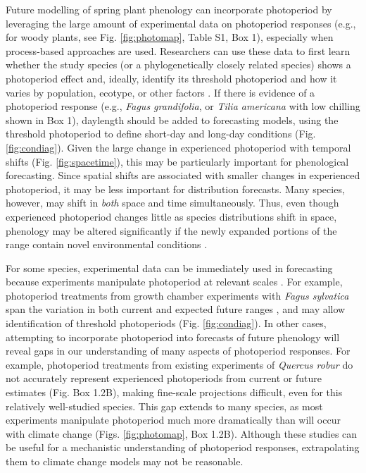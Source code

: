 \documentclass{article}
\begin{document}
\par Future modelling of spring plant phenology can incorporate photoperiod by leveraging the large amount of experimental data on photoperiod responses (e.g., for woody plants, see Fig. \ref{fig:photomap}, Table S1, Box 1), especially when process-based approaches are used. Researchers can use these data to first learn whether the study species (or a phylogenetically closely related species) shows a photoperiod effect and, ideally, identify its threshold photoperiod and how it varies by population, ecotype, or other factors \citep{tobin2008,bradshaw2006}. If there is evidence of a photoperiod response (e.g., \emph{Fagus grandifolia}, or \emph{Tilia americana} with low chilling shown in Box 1), daylength should be added to forecasting models, using the threshold photoperiod to define short-day and long-day conditions (Fig. \ref{fig:condiag}). Given the large change in experienced photoperiod with temporal shifts (Fig. \ref{fig:spacetime}), this may be particularly important for phenological forecasting. Since spatial shifts are associated with smaller changes in experienced photoperiod, it may be less important for distribution forecasts. Many species, however, may shift in \emph{both} space and time simultaneously. Thus, even though experienced photoperiod changes little as species distributions shift in space, phenology may be altered significantly if the newly expanded portions of the range contain novel environmental conditions \citep{martin2014}.

\par For some species, experimental data can be immediately used in forecasting because experiments manipulate photoperiod at relevant scales \citep[e.g., ][Figs. \ref{fig:photomap}\& Box 1.1, Table S1]{Heide:2015aa,Basler:2014aa}. For example, photoperiod treatments from growth chamber experiments with \emph{Fagus sylvatica} span the variation in both current and expected future ranges \citep[Fig. Box 1.2, ][]{duputie2015}, and may allow identification of threshold photoperiods (Fig. \ref{fig:condiag}). In other cases, attempting to incorporate photoperiod into forecasts of future phenology will reveal gaps in our understanding of many aspects of photoperiod responses. For example, photoperiod treatments from existing experiments of \emph{Quercus robur} do not accurately represent experienced photoperiods from current or future estimates (Fig. Box 1.2B), making fine-scale projections difficult, even for this relatively well-studied species. This gap extends to many species, as most experiments manipulate photoperiod much more dramatically than will occur with climate change (Figs. \ref{fig:photomap}, Box 1.2B). Although these studies can be useful for a mechanistic understanding of photoperiod responses, extrapolating them to climate change models may not be reasonable. 
 
\end{document}
